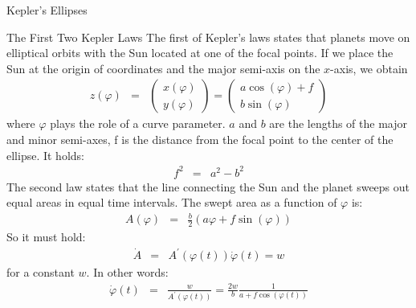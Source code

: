 \def\titlestr{Kepler's Ellipses}
\ifx\makebook\undefined
	
\else
	\begin{chapter}{\titlestr}
\fi

\begin{section}{The First Two Kepler Laws}
The first of Kepler's laws states that planets move on elliptical orbits with the Sun located at one of the focal points.
If we place the Sun at the origin of coordinates and the major semi-axis on the $x$-axis, we obtain
\begin{eqnarray*}
z(\varphi) &=&
\begin{pmatrix}
x(\varphi)\\
y(\varphi)
\end{pmatrix}
=
\begin{pmatrix}
a\cos(\varphi)+f\\
b\sin(\varphi)
\end{pmatrix}
\end{eqnarray*}
where $\varphi$ plays the role of a curve parameter. $a$ and $b$ are the lengths of the major and minor semi-axes, f is the distance from the focal point to the center of the ellipse. It holds:
\begin{eqnarray*}
f^2 &=& a^2-b^2
\end{eqnarray*}
The second law states that the line connecting the Sun and the planet sweeps out equal areas in equal time intervals. The swept area as a function of $\varphi$ is:
\begin{eqnarray*}
A(\varphi) &=& \frac{b}{2}\left(a\varphi+f\sin(\varphi)\right)
\end{eqnarray*}
So it must hold:
\begin{eqnarray*}
\dot{A} &=& A^\prime(\varphi(t))\dot{\varphi}(t) = w
\end{eqnarray*}
for a constant $w$. In other words:
\begin{eqnarray*}
\dot{\varphi}(t) &=& \frac{w}{A^\prime(\varphi(t))} = \frac{2w}{b}\frac{1}{a+f\cos(\varphi(t))}
\end{eqnarray*}
\end{section}


\end{chapter}
